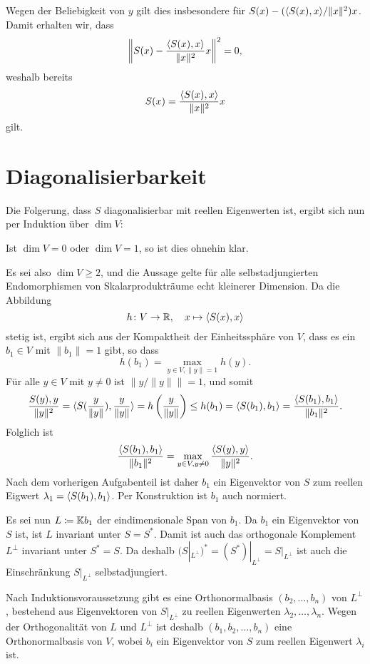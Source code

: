 \documentclass[a4paper,10pt]{scrartcl}
\begin{document}
Wegen der Beliebigkeit von $y$ gilt dies insbesondere für $S(x) - (\langle S(x),x \rangle/\|x\|^2) x$.
Damit erhalten wir, dass
\[
  \left\| S(x) - \frac{\langle S(x),x \rangle}{\|x\|^2} x \right\|^2 = 0,
\]
weshalb bereits
\[
  S(x) = \frac{\langle S(x),x \rangle}{\|x\|^2} x
\]
gilt.










\section{Diagonalisierbarkeit}


Die Folgerung, dass $S$ diagonalisierbar mit reellen Eigenwerten ist, ergibt sich nun per Induktion über $\dim V$:

Ist $\dim V = 0$ oder $\dim V = 1$, so ist dies ohnehin klar.

Es sei also $\dim V \geq 2$, und die Aussage gelte für alle selbstadjungierten Endomorphismen von Skalarprodukträume echt kleinerer  Dimension.
Da die Abbildung
\[
  h \colon V \to \mathbb{R},
  \quad
  x \mapsto \langle S(x),x \rangle
\]
stetig ist, ergibt sich aus der Kompaktheit der Einheitssphäre von $V$, dass es ein $b_1 \in V$ mit $\|b_1\| = 1$ gibt, so dass
\[
  h(b_1) = \max_{y \in V, \|y\| = 1} h(y).
\]
Für alle $y \in V$ mit $y \neq 0$ ist $\| y/\|y\| \| = 1$, und somit
\[
        \frac{S(y), y}{\|y\|^2}
  =     \langle  S( \frac{y}{\|y\|} ), \frac{y}{\|y\|}  \rangle
  =     h\left( \frac{y}{\|y\|} \right)
  \leq  h(b_1)
  =     \langle S(b_1), b_1 \rangle
  =     \frac{ \langle S(b_1), b_1 \rangle }{ \|b_1\|^2 }.
\]
Folglich ist
\[
    \frac{ \langle S(b_1), b_1 \rangle }{ \|b_1\|^2 }
  = \max_{y \in V, y \neq 0} \frac{ \langle S(y), y \rangle }{ \|y\|^2 }.
\]
Nach dem vorherigen Aufgabenteil ist daher $b_1$ ein Eigenvektor von $S$ zum reellen Eigwert $\lambda_1 = \langle S(b_1), b_1 \rangle$.
Per Konstruktion ist $b_1$ auch normiert.

Es sei nun $L \coloneqq \mathbb{K} b_1$ der eindimensionale Span von $b_1$.
Da $b_1$ ein Eigenvektor von $S$ ist, ist $L$ invariant unter $S = S^*$.
Damit ist auch das orthogonale Komplement $L^\perp$ invariant unter $S^* = S$.
Da deshalb $(S|_{L^\perp})^* = (S^*)|_{L^\perp} = S|_{L^\perp}$ ist auch die Einschränkung $S|_{L^\perp}$ selbstadjungiert.

Nach Induktionsvoraussetzung gibt es eine Orthonormalbasis $(b_2, \dotsc, b_n)$ von $L^\perp$, bestehend aus Eigenvektoren von $S|_{L^\perp}$ zu reellen Eigenwerten $\lambda_2, \dotsc, \lambda_n$.
Wegen der Orthogonalität von $L$ und $L^\perp$ ist deshalb $(b_1, b_2, \dotsc, b_n)$ eine Orthonormalbasis von $V$, wobei $b_i$ ein Eigenvektor von $S$ zum reellen Eigenwert $\lambda_i$ ist.
\end{document}
